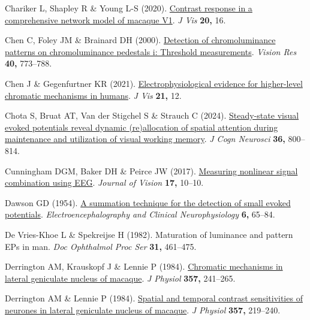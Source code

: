 \documentclass[
  letterpaper,
  DIV=11,
  numbers=noendperiod]{scrartcl}
\newlength{\cslhangindent}
\newenvironment{CSLReferences}[2] %
 {\begin{list}{}{%
  \setlength{\itemindent}{0pt}
  \setlength{\leftmargin}{0pt}
  \setlength{\parsep}{0pt}
  \ifodd #1
   \setlength{\leftmargin}{\cslhangindent}
   \setlength{\itemindent}{-1\cslhangindent}
  \fi
  \setlength{\itemsep}{#2\baselineskip}}}
 {\end{list}}
\begin{document}
\begin{CSLReferences}{1}{1}
Chariker L, Shapley R \& Young L-S (2020).
\href{https://doi.org/10.1167/jov.20.4.16}{Contrast response in a
comprehensive network model of macaque V1}. \emph{J Vis} \textbf{20,}
16.

Chen C, Foley JM \& Brainard DH (2000).
\href{https://doi.org/10.1016/s0042-6989(99)00227-8}{Detection of
chromoluminance patterns on chromoluminance pedestals i: Threshold
measurements}. \emph{Vision Res} \textbf{40,} 773--788.

Chen J \& Gegenfurtner KR (2021).
\href{https://doi.org/10.1167/jov.21.8.12}{Electrophysiological evidence
for higher-level chromatic mechanisms in humans}. \emph{J Vis}
\textbf{21,} 12.

Chota S, Bruat AT, Van der Stigchel S \& Strauch C (2024).
\href{https://doi.org/10.1162/jocn_a_02107}{Steady-state visual evoked
potentials reveal dynamic (re)allocation of spatial attention during
maintenance and utilization of visual working memory}. \emph{J Cogn
Neurosci} \textbf{36,} 800--814.

Cunningham DGM, Baker DH \& Peirce JW (2017).
\href{https://doi.org/10.1167/17.5.10}{{Measuring nonlinear signal
combination using EEG}}. \emph{Journal of Vision} \textbf{17,} 10--10.

Dawson GD (1954). \href{https://doi.org/10.1016/0013-4694(54)90007-3}{A
summation technique for the detection of small evoked potentials}.
\emph{Electroencephalography and Clinical Neurophysiology} \textbf{6,}
65--84.

De Vries-Khoe L \& Spekreijse H (1982). Maturation of luminance and
pattern EPs in man. \emph{Doc Ophthalmol Proc Ser} \textbf{31,}
461--475.

Derrington AM, Krauskopf J \& Lennie P (1984).
\href{https://doi.org/10.1113/jphysiol.1984.sp015499}{Chromatic
mechanisms in lateral geniculate nucleus of macaque}. \emph{J Physiol}
\textbf{357,} 241--265.

Derrington AM \& Lennie P (1984).
\href{https://doi.org/10.1113/jphysiol.1984.sp015498}{Spatial and
temporal contrast sensitivities of neurones in lateral geniculate
nucleus of macaque}. \emph{J Physiol} \textbf{357,} 219--240.


\end{CSLReferences}
\end{document}
